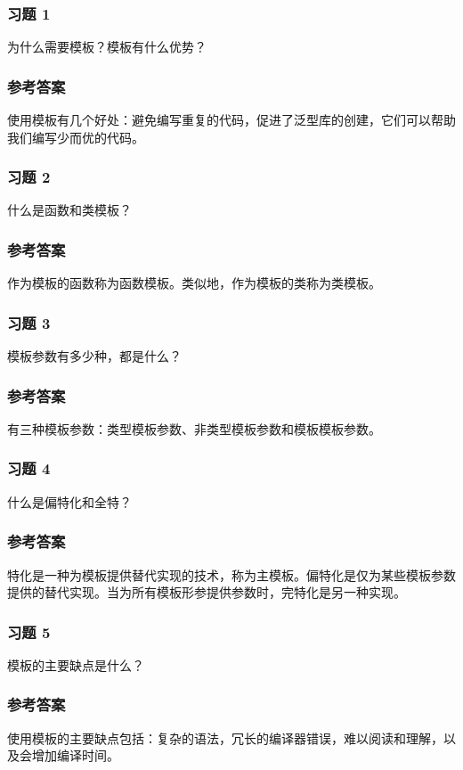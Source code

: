 
\subsubsection{习题 1}

为什么需要模板？模板有什么优势？

\subsubsection{参考答案}

使用模板有几个好处：避免编写重复的代码，促进了泛型库的创建，它们可以帮助我们编写少而优的代码。

\subsubsection{习题 2}

什么是函数和类模板？

\subsubsection{参考答案}

作为模板的函数称为函数模板。类似地，作为模板的类称为类模板。

\subsubsection{习题 3}

模板参数有多少种，都是什么？

\subsubsection{参考答案}

有三种模板参数：类型模板参数、非类型模板参数和模板模板参数。

\subsubsection{习题 4}

什么是偏特化和全特？

\subsubsection{参考答案}

特化是一种为模板提供替代实现的技术，称为主模板。偏特化是仅为某些模板参数提供的替代实现。当为所有模板形参提供参数时，完特化是另一种实现。

\subsubsection{习题 5}

模板的主要缺点是什么？

\subsubsection{参考答案}

使用模板的主要缺点包括：复杂的语法，冗长的编译器错误，难以阅读和理解，以及会增加编译时间。



